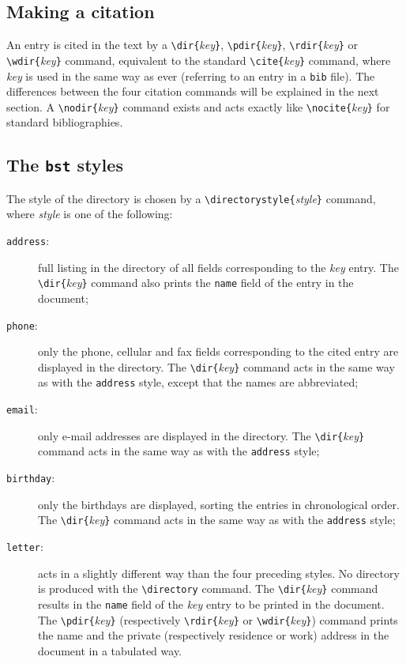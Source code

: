 \documentclass[10pt]{article}
\begin{document}
\subsection{Making a citation}

An entry is cited in the text by a \verb'\dir{'\emph{key}\verb'}',
\verb'\pdir{'\emph{key}\verb'}', \verb'\rdir{'\emph{key}\verb'}' or
\verb'\wdir{'\emph{key}\verb'}' command, equivalent to the standard
\verb'\cite{'\emph{key}\verb'}' command, where \emph{key} is used in the same
way as ever (referring to an entry in a \texttt{bib} file).
The differences between the four citation commands will be explained in the next
section.
A \verb'\nodir{'\emph{key}\verb'}' command exists and acts exactly like
\verb'\nocite{'\emph{key}\verb'}' for standard bibliographies.

\subsection{The \texttt{bst} styles}

The style of the directory is chosen by a \verb'\directorystyle{'\emph{style}\verb'}'
command, where \emph{style} is one of the following:
\begin{description}
\item[\textmd{\texttt{address}:}]
full listing in the directory of all fields corresponding to the
\emph{key} entry. The \verb'\dir{'\emph{key}\verb'}' command also prints the
\texttt{name} field of the entry in the document;
\item[\textmd{\texttt{phone}:}]
only the phone, cellular and fax fields corresponding to the cited entry are
displayed in the directory. The \verb'\dir{'\emph{key}\verb'}' command acts in
the same way as with the \texttt{address} style, except that the names are
abbreviated;
\item[\textmd{\texttt{email}:}]
only e-mail addresses are displayed in the directory. The
\verb'\dir{'\emph{key}\verb'}' command acts in the same way as with the
\texttt{address} style;
\item[\textmd{\texttt{birthday}:}]
only the birthdays are displayed, sorting the entries in chronological
order. The \verb'\dir{'\emph{key}\verb'}' command acts in the same way as with
the \texttt{address} style;
\item[\textmd{\texttt{letter}:}]
acts in a slightly different way than the four preceding styles. No directory
is produced with the \verb|\directory| command. The
\verb'\dir{'\emph{key}\verb'}' command results in the \texttt{name} field of
the \emph{key} entry to be printed in the document. The
\verb'\pdir{'\emph{key}\verb'}' (respectively \verb'\rdir{'\emph{key}\verb'}'
or \verb'\wdir{'\emph{key}\verb'}') command prints the name and the private
(respectively residence or work) address in the document in a tabulated way.
\end{description}
\end{document}
